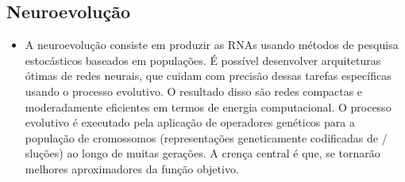 \subsection{\textbf{Neuroevolução}}
\begin{itemize}
    \item A neuroevolução consiste em produzir as RNAs usando métodos de pesquisa estocásticos baseados em populações. É possível desenvolver arquiteturas ótimas de redes neurais, que cuidam com precisão dessas  tarefas específicas usando o processo evolutivo.
O resultado disso são redes compactas e moderadamente eficientes em termos de energia computacional. O processo evolutivo é executado pela aplicação de operadores genéticos para a população de cromossomos (representações geneticamente codificadas de / sluções) ao longo de muitas gerações. A crença central é que, se tornarão melhores aproximadores da função objetivo.\cite{neuroevolucao}
\end{itemize}

%
%
